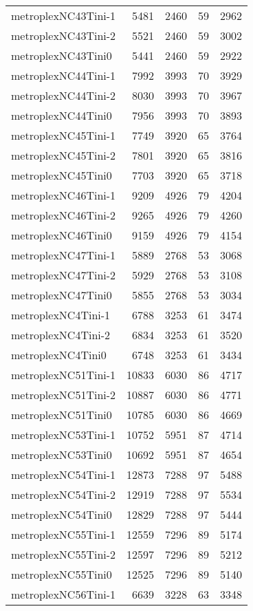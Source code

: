 \begin{longtable}{lrrrr}
metroplexNC43Tini-1 & 5481 & 2460 & 59 & 2962 \\
metroplexNC43Tini-2 & 5521 & 2460 & 59 & 3002 \\
metroplexNC43Tini0 & 5441 & 2460 & 59 & 2922 \\
metroplexNC44Tini-1 & 7992 & 3993 & 70 & 3929 \\
metroplexNC44Tini-2 & 8030 & 3993 & 70 & 3967 \\
metroplexNC44Tini0 & 7956 & 3993 & 70 & 3893 \\
metroplexNC45Tini-1 & 7749 & 3920 & 65 & 3764 \\
metroplexNC45Tini-2 & 7801 & 3920 & 65 & 3816 \\
metroplexNC45Tini0 & 7703 & 3920 & 65 & 3718 \\
metroplexNC46Tini-1 & 9209 & 4926 & 79 & 4204 \\
metroplexNC46Tini-2 & 9265 & 4926 & 79 & 4260 \\
metroplexNC46Tini0 & 9159 & 4926 & 79 & 4154 \\
metroplexNC47Tini-1 & 5889 & 2768 & 53 & 3068 \\
metroplexNC47Tini-2 & 5929 & 2768 & 53 & 3108 \\
metroplexNC47Tini0 & 5855 & 2768 & 53 & 3034 \\
metroplexNC4Tini-1 & 6788 & 3253 & 61 & 3474 \\
metroplexNC4Tini-2 & 6834 & 3253 & 61 & 3520 \\
metroplexNC4Tini0 & 6748 & 3253 & 61 & 3434 \\
metroplexNC51Tini-1 & 10833 & 6030 & 86 & 4717 \\
metroplexNC51Tini-2 & 10887 & 6030 & 86 & 4771 \\
metroplexNC51Tini0 & 10785 & 6030 & 86 & 4669 \\
metroplexNC53Tini-1 & 10752 & 5951 & 87 & 4714 \\
metroplexNC53Tini0 & 10692 & 5951 & 87 & 4654 \\
metroplexNC54Tini-1 & 12873 & 7288 & 97 & 5488 \\
metroplexNC54Tini-2 & 12919 & 7288 & 97 & 5534 \\
metroplexNC54Tini0 & 12829 & 7288 & 97 & 5444 \\
metroplexNC55Tini-1 & 12559 & 7296 & 89 & 5174 \\
metroplexNC55Tini-2 & 12597 & 7296 & 89 & 5212 \\
metroplexNC55Tini0 & 12525 & 7296 & 89 & 5140 \\
metroplexNC56Tini-1 & 6639 & 3228 & 63 & 3348 \\

\end{longtable}

